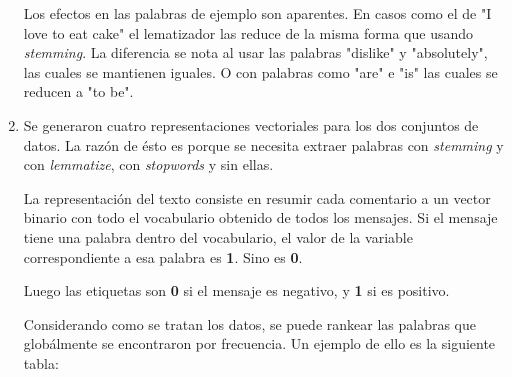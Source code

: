 \documentclass[11pt,letterpaper]{article}
\begin{document}
\begin{enumerate}
Los efectos en las palabras de ejemplo son aparentes. En casos como el de
"I love to eat cake" el lematizador las reduce de la misma forma que usando
\emph{stemming}. La diferencia se nota al usar las palabras "dislike" y
"absolutely", las cuales se mantienen iguales. O con palabras como "are" e
"is" las cuales se reducen a "to be".
\item Se generaron cuatro representaciones vectoriales para los dos conjuntos de
datos. La razón de ésto es porque se necesita extraer palabras con
\emph{stemming} y con \emph{lemmatize}, con \emph{stopwords} y sin ellas.

La representación del texto consiste en resumir cada comentario a un vector
binario con todo el vocabulario obtenido de todos los mensajes. Si el
mensaje tiene una palabra dentro del vocabulario, el valor de la variable
correspondiente a esa palabra es \textbf{1}. Sino es \textbf{0}. 

Luego las etiquetas son \textbf{0} si el mensaje es negativo, y \textbf{1} si es
positivo.

Considerando como se tratan los datos, se puede rankear las palabras que
globálmente se encontraron por frecuencia. Un ejemplo de ello es la
siguiente tabla:


\end{enumerate}
\end{document}
